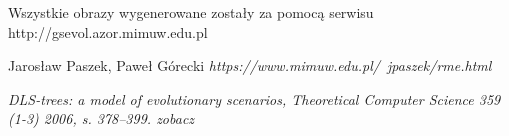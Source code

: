 \documentclass[licencjacka]{pracamgr}
\begin{document}
\begin{thebibliography}{99}

 Wszystkie obrazy wygenerowane zostały za pomocą serwisu http://gsevol.azor.mimuw.edu.pl 

 Jarosław Paszek, Paweł Górecki \textit{https://www.mimuw.edu.pl/~jpaszek/rme.html}
  
  \textit{DLS-trees: a model of evolutionary scenarios, Theoretical Computer Science 359 (1-3) 2006, s. 378–399.
zobacz}

\end{thebibliography}
\end{document}
